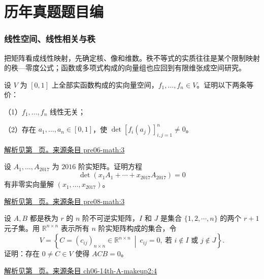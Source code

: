 \documentclass[UTF8,12pt,a4paper,fontset=fandol]{ctexart}
\begin{document}
\part{历年真题题目编}

\section{线性空间、线性相关与秩}

\label{sec:questions-1}

把矩阵看成线性映射，先确定核、像和维数。秩不等式的实质往往是某个限制映射的秩—零度公式；函数或多项式构成的向量组也应回到有限维张成空间研究。

\begin{example}\label{ex:pre06-math:3}

设 $V$ 为 $[0,1]$ 上全部实函数构成的实向量空间，$f_1,\ldots,f_n\in V$。证明以下两条等价：

（1）$f_1,\ldots,f_n$ 线性无关；

（2）存在 $a_1,\ldots,a_n\in[0,1]$，使 $\det[f_i(a_j)]_{i,j=1}^n\ne0$。

\par\hyperref[ans:pre06-math:3]{解析见第~\pageref{ans:pre06-math:3} 页。}\quad\href{https://github.com/lzxcr/cmc-mathematics/blob/64916fa1fdbc3e444a652eca204d5669058ee321/src/problems/preliminary/06/03.md}{来源条目 pre06-math:3}

\end{example}

\begin{example}\label{ex:pre08-math:3}

设 $A_1,\ldots,A_{2017}$ 为 $2016$ 阶实矩阵。证明方程
\[
\det(x_1A_1+\cdots+x_{2017}A_{2017})=0
\]
有非零实向量解 $(x_1,\ldots,x_{2017})$。

\par\hyperref[ans:pre08-math:3]{解析见第~\pageref{ans:pre08-math:3} 页。}\quad\href{https://github.com/lzxcr/cmc-mathematics/blob/64916fa1fdbc3e444a652eca204d5669058ee321/src/problems/preliminary/08/03.md}{来源条目 pre08-math:3}

\end{example}

\begin{example}\label{ex:ch06-14th-A-makeup2:4}

设 $A,B$ 都是秩为 $r$ 的 $n$ 阶不可逆实矩阵，$I$ 和 $J$ 是集合 $\{1,2,\cdots,n\}$ 的两个 $r+1$ 元子集。用 $\mathbb{R}^{n\times n}$ 表示所有 $n$ 阶实矩阵构成的集合，令
\[
V=\left\{C=\left(c_{ij}\right)_{n\times n}\in\mathbb{R}^{n\times n}\ \middle|\ c_{ij}=0,\ \text{若 } i\notin I \text{ 或 } j\notin J\right\}.
\]
证明：存在 $0\neq C\in V$ 使得 $ACB=0$。

\par\hyperref[ans:ch06-14th-A-makeup2:4]{解析见第~\pageref{ans:ch06-14th-A-makeup2:4} 页。}\quad\href{https://github.com/lzxcr/cmc-mathematics/blob/64916fa1fdbc3e444a652eca204d5669058ee321/src/problems/preliminary/14-makeup2/04.md}{来源条目 ch06-14th-A-makeup2:4}

\end{example}
\end{document}
